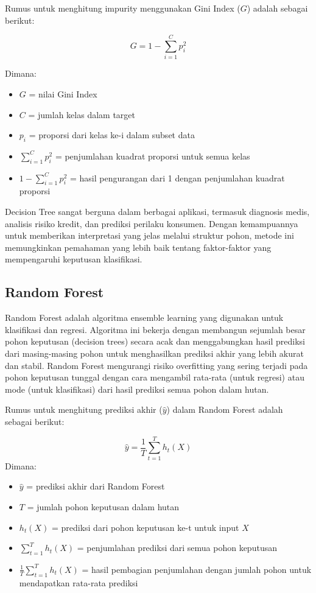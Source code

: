 Rumus untuk menghitung impurity menggunakan Gini Index ($G$) adalah sebagai berikut:

\begin{equation}
    G = 1 - \sum_{i=1}^{C} p_i^2
\end{equation}

Dimana:
\begin{itemize}
    \item $G$ = nilai Gini Index
    \item $C$ = jumlah kelas dalam target
    \item $p_i$ = proporsi dari kelas ke-i dalam subset data
    \item $\sum_{i=1}^{C} p_i^2$ = penjumlahan kuadrat proporsi untuk semua kelas
    \item $1 - \sum_{i=1}^{C} p_i^2$ = hasil pengurangan dari 1 dengan penjumlahan kuadrat proporsi
\end{itemize}

Decision Tree sangat berguna dalam berbagai aplikasi, termasuk diagnosis medis, analisis risiko kredit, dan prediksi perilaku konsumen. Dengan kemampuannya untuk memberikan interpretasi yang jelas melalui struktur pohon, metode ini memungkinkan pemahaman yang lebih baik tentang faktor-faktor yang mempengaruhi keputusan klasifikasi.

\subsection{Random Forest}
Random Forest adalah algoritma ensemble learning yang digunakan untuk klasifikasi dan regresi. Algoritma ini bekerja dengan membangun sejumlah besar pohon keputusan (decision trees) secara acak dan menggabungkan hasil prediksi dari masing-masing pohon untuk menghasilkan prediksi akhir yang lebih akurat dan stabil. Random Forest mengurangi risiko overfitting yang sering terjadi pada pohon keputusan tunggal dengan cara mengambil rata-rata (untuk regresi) atau mode (untuk klasifikasi) dari hasil prediksi semua pohon dalam hutan. \parencite{breiman2001random}

Rumus untuk menghitung prediksi akhir ($\hat{y}$) dalam Random Forest adalah sebagai berikut:

\begin{equation}
    \hat{y} = \frac{1}{T} \sum_{t=1}^{T} h_t(X)
\end{equation}
Dimana:
\begin{itemize}
    \item $\hat{y}$ = prediksi akhir dari Random Forest
    \item $T$ = jumlah pohon keputusan dalam hutan
    \item $h_t(X)$ = prediksi dari pohon keputusan ke-t untuk input $X$
    \item $\sum_{t=1}^{T} h_t(X)$ = penjumlahan prediksi dari semua pohon keputusan
    \item $\frac{1}{T} \sum_{t=1}^{T} h_t(X)$ = hasil pembagian penjumlahan dengan jumlah pohon untuk mendapatkan rata-rata prediksi
\end{itemize}

